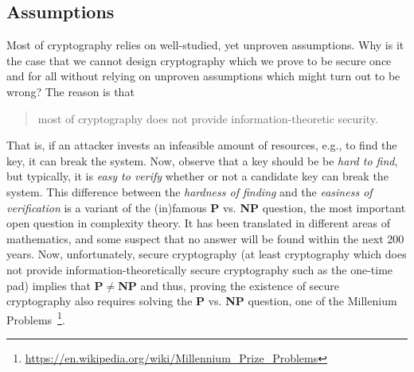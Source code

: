 \subsection{Assumptions}\label{ssec:assumptions}
Most of cryptography relies on well-studied, yet unproven assumptions. Why is it the case that we cannot design cryptography which we prove to be secure once and for all without relying on unproven assumptions which might turn out to be wrong? The reason is that
\begin{quote}
most of cryptography does not provide information-theoretic security.
\end{quote}
That is, if an attacker invests an infeasible amount of resources, e.g., to find the key, it can break the system. Now, observe that a key should be be \emph{hard to find}, but typically, it is \emph{easy to verify} whether or not a candidate key can break the system. This difference between the \emph{hardness of finding} and the \emph{easiness of verification} is a variant of the (in)famous \textbf{P} vs. \textbf{NP} question, the most important open question in complexity theory. It has been translated in different areas of mathematics, and some suspect that no answer will be found within the next 200 years. Now, unfortunately, secure cryptography (at least cryptography which does not provide information-theoretically secure cryptography such as the one-time pad) implies that \textbf{P}$\neq$\textbf{NP} and thus, proving the existence of secure cryptography also requires solving the \textbf{P} vs. \textbf{NP} question, one of the Millenium Problems~\footnote{\url{https://en.wikipedia.org/wiki/Millennium_Prize_Problems}}.